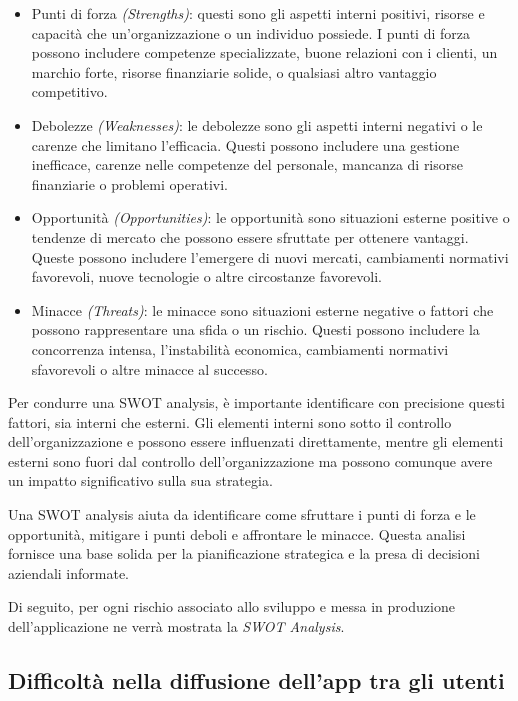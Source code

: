 \begin{itemize}

	\item Punti di forza \textit{(Strengths)}: questi sono gli aspetti interni positivi, risorse e capacità che un'organizzazione o un individuo possiede. I punti di forza possono includere competenze specializzate, buone relazioni con i clienti, un marchio forte, risorse finanziarie solide, o qualsiasi altro vantaggio competitivo.
	
	\item Debolezze \textit{(Weaknesses)}: le debolezze sono gli aspetti interni negativi o le carenze che limitano l'efficacia. Questi possono includere una gestione inefficace, carenze nelle competenze del personale, mancanza di risorse finanziarie o problemi operativi.

	\item Opportunità \textit{(Opportunities)}: le opportunità sono situazioni esterne positive o tendenze di mercato che possono essere sfruttate per ottenere vantaggi. Queste possono includere l'emergere di nuovi mercati, cambiamenti normativi favorevoli, nuove tecnologie o altre circostanze favorevoli.
	
	\item Minacce \textit{(Threats)}: le minacce sono situazioni esterne negative o fattori che possono rappresentare una sfida o un rischio. Questi possono includere la concorrenza intensa, l'instabilità economica, cambiamenti normativi sfavorevoli o altre minacce al successo.

\end{itemize}

Per condurre una SWOT analysis, è importante identificare con precisione questi fattori, sia interni che esterni. Gli elementi interni sono sotto il controllo dell'organizzazione e possono essere influenzati direttamente, mentre gli elementi esterni sono fuori dal controllo dell'organizzazione ma possono comunque avere un impatto significativo sulla sua strategia.

Una SWOT analysis aiuta da identificare come sfruttare i punti di forza e le opportunità, mitigare i punti deboli e affrontare le minacce. Questa analisi fornisce una base solida per la pianificazione strategica e la presa di decisioni aziendali informate.

Di seguito, per ogni rischio associato allo sviluppo e messa in produzione dell'applicazione ne verrà mostrata la \textit{SWOT Analysis}. 

\subsection{Difficoltà nella diffusione dell'app tra gli utenti}

